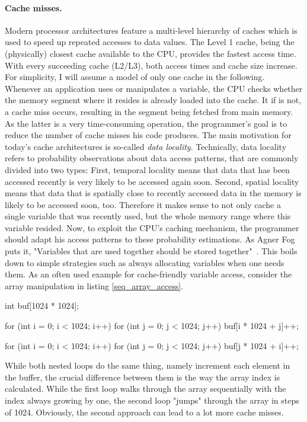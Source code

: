 \paragraph{Cache misses.} Modern processor architectures feature a multi-level hierarchy of caches which is used to speed up repeated accesses to data values. The Level 1 cache, being the (physically) closest cache available to the CPU, provides the fastest access time. With every succeeding cache (L2/L3), both access times and cache size increase. For simplicity, I will assume a model of only one cache in the following. Whenever an application uses or manipulates a variable, the CPU checks whether the memory segment where it resides is already loaded into the cache. It if is not, a cache miss occurs, resulting in the segment being fetched from main memory. As the latter is a very time-consuming operation, the programmer's goal is to reduce the number of cache misses his code produces. The main motivation for today's cache architectures is so-called \emph{data locality}. Technically, data locality refers to probability observations about data access patterns, that are commonly divided into two types: First, temporal locality means that data that has been accessed recently is very likely to be accessed again soon. Second, spatial locality means that data that is spatially close to recently accessed data in the memory is likely to be accessed soon, too. Therefore it makes sense to not only cache a single variable that was recently used, but the whole memory range where this variable resided. Now, to exploit the CPU's caching mechanism, the programmer should adapt his access patterns to these probability estimations. As Agner Fog puts it, "Variables that are used together should be stored together"~\cite[p. 88]{fog2011optimizing}. This boils down to simple strategies such as always allocating variables when one needs them. As an often used example for cache-friendly variable access, consider the array manipulation in listing \ref{seq_array_access}.
\begin{code}[caption={Sequential vs. non-sequential array access}, label=seq_array_access]
int buf[1024 * 1024];

for (int i = 0; i < 1024; i++)
  for (int j = 0; j < 1024; j++)
    buf[i * 1024 + j]++;

for (int i = 0; i < 1024; i++)
  for (int j = 0; j < 1024; j++)
    buf[j * 1024 + i]++;
\end{code}

While both nested loops do the same thing, namely increment each element in the buffer, the crucial difference between them is the way the array index is calculated. While the first loop walks through the array sequentially with the index always growing by one, the second loop "jumps" through the array in steps of 1024. Obviously, the second approach can lead to a lot more cache misses.

